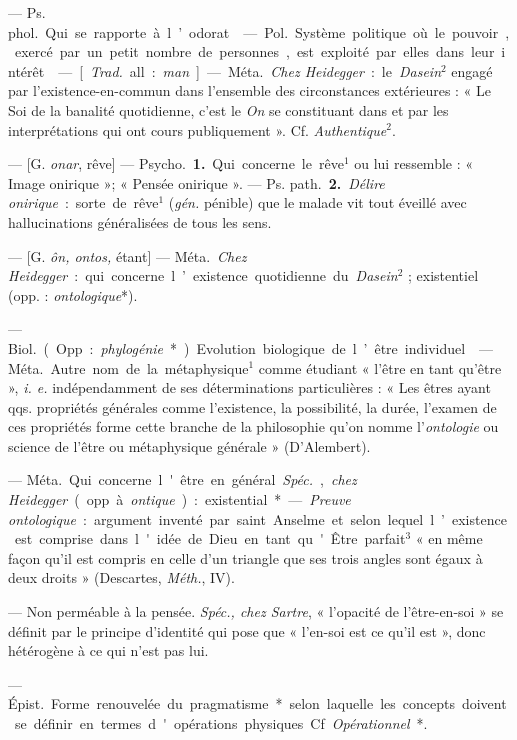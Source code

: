 \begin{itemize}[leftmargin=1cm, label=, itemsep=1pt]
 — \si{Ps. phol.} Qui se rapporte à l’odorat.

 — \si{Pol.} Système politique où le pouvoir, exercé par un
petit nombre de personnes, est exploité par elles dans leur intérêt.

 — [{\it Trad.} all. : {\it man}] — \si{Méta.} {\it Chez Heidegger} :
le {\it Dasein}$^2$ engagé par l’existence-en-commun dans l’ensemble des
circonstances extérieures : « Le Soi de la banalité quotidienne, c’est le
{\it On} se constituant dans et par les interprétations qui ont cours
publiquement ». Cf. {\it Authentique}$^2$.

 — [G. {\it onar}, rêve] — \si{Psycho.} {\bf 1.} Qui concerne le
rêve$^1$ ou lui ressemble : « Image onirique »; « Pensée onirique ». —
\si{Ps. path.} {\bf 2.} {\it Délire onirique} : sorte de rêve$^1$ ({\it gén.}
pénible) que le malade vit tout éveillé avec hallucinations généralisées de
tous les sens.

 — [G. {\it ôn, ontos,} étant] — \si{Méta.} {\it Chez
Heidegger} : qui concerne l’existence quotidienne du {\it Dasein}$^2$ ;
existentiel (opp. : {\it ontologique}*).

 — \si{Biol.} (Opp. : {\it phylogénie}*). Evolution biologique
de l’être individuel.

 — \si{Méta.} Autre nom de la métaphysique$^1$ comme étudiant «
l'être en tant qu'être », {\it i. e.} indépendamment de ses déterminations
particulières : « Les êtres ayant qqs. propriétés générales comme l’existence,
la possibilité, la durée, l’examen de ces propriétés forme cette branche de
la philosophie qu’on nomme l’{\it ontologie} ou science de l'être ou
métaphysique générale » (D’Alembert).

 — \si{Méta.} Qui concerne l'être en général. {\it Spéc.},
{\it chez Heidegger} (opp. à {\it ontique}) : existential*. — {\it Preuve
ontologique} : argument inventé par saint Anselme et selon lequel l’existence
est comprise dans l'idée de Dieu en tant qu'Être parfait$^3$ « en même façon
qu'il est compris en celle d’un triangle que ses trois angles sont égaux à
deux droits » (Descartes, {\it Méth.}, IV).

 — Non perméable à la pensée. {\it Spéc., chez Sartre}, «
l’opacité de l’être-en-soi » se définit par le principe d'identité qui pose
que « l’en-soi est ce qu’il est », donc hétérogène à ce qui n’est pas lui.

 —  \si{Épist.} Forme renouvelée du
pragmatisme* selon laquelle les concepts doivent se définir en termes
d'opérations physiques. Cf. {\it Opérationnel}*.


\end{itemize}
